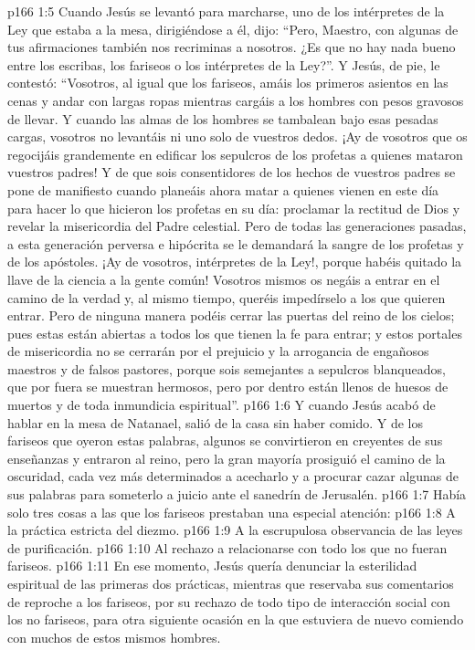 \vs p166 1:5 \pc Cuando Jesús se levantó para marcharse, uno de los intérpretes de la Ley que estaba a la mesa, dirigiéndose a él, dijo: “Pero, Maestro, con algunas de tus afirmaciones también nos recriminas a nosotros. ¿Es que no hay nada bueno entre los escribas, los fariseos o los intérpretes de la Ley?”. Y Jesús, de pie, le contestó: “Vosotros, al igual que los fariseos, amáis los primeros asientos en las cenas y andar con largas ropas mientras cargáis a los hombres con pesos gravosos de llevar. Y cuando las almas de los hombres se tambalean bajo esas pesadas cargas, vosotros no levantáis ni uno solo de vuestros dedos. ¡Ay de vosotros que os regocijáis grandemente en edificar los sepulcros de los profetas a quienes mataron vuestros padres! Y de que sois consentidores de los hechos de vuestros padres se pone de manifiesto cuando planeáis ahora matar a quienes vienen en este día para hacer lo que hicieron los profetas en su día: proclamar la rectitud de Dios y revelar la misericordia del Padre celestial. Pero de todas las generaciones pasadas, a esta generación perversa e hipócrita se le demandará la sangre de los profetas y de los apóstoles. ¡Ay de vosotros, intérpretes de la Ley!, porque habéis quitado la llave de la ciencia a la gente común! Vosotros mismos os negáis a entrar en el camino de la verdad y, al mismo tiempo, queréis impedírselo a los que quieren entrar. Pero de ninguna manera podéis cerrar las puertas del reino de los cielos; pues estas están abiertas a todos los que tienen la fe para entrar; y estos portales de misericordia no se cerrarán por el prejuicio y la arrogancia de engañosos maestros y de falsos pastores, porque sois semejantes a sepulcros blanqueados, que por fuera se muestran hermosos, pero por dentro están llenos de huesos de muertos y de toda inmundicia espiritual”.
\vs p166 1:6 Y cuando Jesús acabó de hablar en la mesa de Natanael, salió de la casa sin haber comido. Y de los fariseos que oyeron estas palabras, algunos se convirtieron en creyentes de sus enseñanzas y entraron al reino, pero la gran mayoría prosiguió el camino de la oscuridad, cada vez más determinados a acecharlo y a procurar cazar algunas de sus palabras para someterlo a juicio ante el sanedrín de Jerusalén.
\vs p166 1:7 \pc Había solo tres cosas a las que los fariseos prestaban una especial atención:
\vs p166 1:8 A la práctica estricta del diezmo.
\vs p166 1:9 A la escrupulosa observancia de las leyes de purificación.
\vs p166 1:10 Al rechazo a relacionarse con todo los que no fueran fariseos.
\vs p166 1:11 \pc En ese momento, Jesús quería denunciar la esterilidad espiritual de las primeras dos prácticas, mientras que reservaba sus comentarios de reproche a los fariseos, por su rechazo de todo tipo de interacción social con los no fariseos, para otra siguiente ocasión en la que estuviera de nuevo comiendo con muchos de estos mismos hombres.
